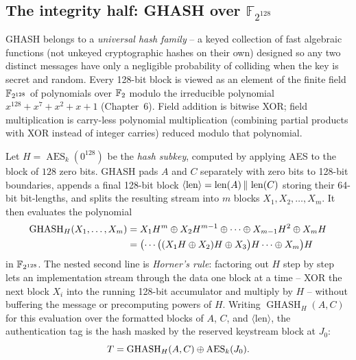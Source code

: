 \subsection{The integrity half: GHASH over \texorpdfstring{$\mathbb{F}_{2^{128}}$}{F\_\{2\textasciicircum 128\}}}
\label{ch16:gcm-ghash}

GHASH belongs to a \emph{universal hash family} -- a keyed collection of fast algebraic functions (not unkeyed cryptographic hashes on their own) designed so any two distinct messages have only a negligible probability of colliding when the key is secret and random. Every 128-bit block is viewed as an element of the finite field $\mathbb{F}_{2^{128}}$ of polynomials over $\mathbb{F}_2$ modulo the irreducible polynomial $x^{128} + x^7 + x^2 + x + 1$ (Chapter~6). Field addition is bitwise XOR; field multiplication is carry-less polynomial multiplication (combining partial products with XOR instead of integer carries) reduced modulo that polynomial.

Let $H = \operatorname{AES}_k(0^{128})$ be the \emph{hash subkey}, computed by applying AES to the block of $128$ zero bits. GHASH pads $A$ and $C$ separately with zero bits to 128-bit boundaries, appends a final 128-bit block $\langle\text{len}\rangle = \operatorname{len}(A) \,\|\, \operatorname{len}(C)$ storing their 64-bit bit-lengths, and splits the resulting stream into $m$ blocks $X_1, X_2, \dots, X_m$. It then evaluates the polynomial
\begin{align*}
\operatorname{GHASH}_H(X_1,\dots,X_m)
  &= X_1 H^{m} \oplus X_2 H^{m-1} \oplus \cdots \oplus X_{m-1} H^{2} \oplus X_m H \\
  &= \bigl(\cdots\bigl((X_1 H \oplus X_2)H \oplus X_3\bigr)H \cdots \oplus X_m\bigr)H
\end{align*}
in $\mathbb{F}_{2^{128}}$. The nested second line is \emph{Horner's rule}: factoring out $H$ step by step lets an implementation stream through the data one block at a time -- XOR the next block $X_i$ into the running 128-bit accumulator and multiply by $H$ -- without buffering the message or precomputing powers of $H$. Writing $\operatorname{GHASH}_H(A, C)$ for this evaluation over the formatted blocks of $A$, $C$, and $\langle\text{len}\rangle$, the authentication tag is the hash masked by the reserved keystream block at $J_0$:
\[
T = \operatorname{GHASH}_H(A, C) \oplus \operatorname{AES}_k(J_0).
\]

